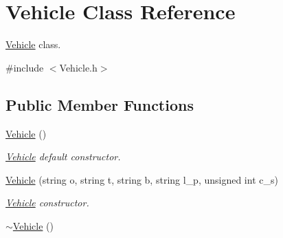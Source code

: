 \hypertarget{class_vehicle}{\section{Vehicle Class Reference}
\label{class_vehicle}
}


\hyperlink{class_vehicle}{Vehicle} class.  




{\ttfamily \#include $<$Vehicle.\+h$>$}

\subsection*{Public Member Functions}
\begin{DoxyCompactItemize}
\item 
\hypertarget{class_vehicle_abaad8187d9f2ede4fb8ea18de0a6764c}{\hyperlink{class_vehicle_abaad8187d9f2ede4fb8ea18de0a6764c}{Vehicle} ()}\label{class_vehicle_abaad8187d9f2ede4fb8ea18de0a6764c}

\begin{DoxyCompactList}\small\item\em \hyperlink{class_vehicle}{Vehicle} default constructor. \end{DoxyCompactList}\item 
\hyperlink{class_vehicle_a95edd9343b3e76eade8df5a44be799e5}{Vehicle} (string o, string t, string b, string l\+\_\+p, unsigned int c\+\_\+s)
\begin{DoxyCompactList}\small\item\em \hyperlink{class_vehicle}{Vehicle} constructor. \end{DoxyCompactList}\item 
\hypertarget{class_vehicle_a61ab140c755b8e0e824d54117cf4546f}{\hyperlink{class_vehicle_a61ab140c755b8e0e824d54117cf4546f}{$\sim$\+Vehicle} ()}\label{class_vehicle_a61ab140c755b8e0e824d54117cf4546f}


\end{DoxyCompactItemize}
